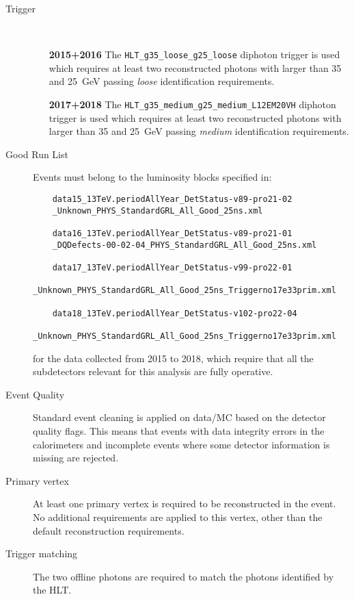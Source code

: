 \begin{description}
	
	\item[Trigger]~
	
	\begin{itemize}
		\item [\textbf{2015+2016}] The \texttt{HLT\_g35\_loose\_g25\_loose} diphoton trigger is used which requires at least two reconstructed photons with \ET larger than 35 and \SI{25}{\GeV} passing \emph{loose} identification requirements.
		
		\item [\textbf{2017+2018}] The \texttt{HLT\_g35\_medium\_g25\_medium\_L12EM20VH} diphoton trigger is used which requires at least two reconstructed photons with \ET larger than 35 and \SI{25}{\GeV} passing \emph{medium} identification requirements.
		
	\end{itemize}
	
	\item[Good Run List] Events must belong to the luminosity blocks specified in:
	\begin{verbatim}
	data15_13TeV.periodAllYear_DetStatus-v89-pro21-02
	_Unknown_PHYS_StandardGRL_All_Good_25ns.xml
	
	data16_13TeV.periodAllYear_DetStatus-v89-pro21-01
	_DQDefects-00-02-04_PHYS_StandardGRL_All_Good_25ns.xml
	
	data17_13TeV.periodAllYear_DetStatus-v99-pro22-01
	_Unknown_PHYS_StandardGRL_All_Good_25ns_Triggerno17e33prim.xml
	
	data18_13TeV.periodAllYear_DetStatus-v102-pro22-04
	_Unknown_PHYS_StandardGRL_All_Good_25ns_Triggerno17e33prim.xml
	\end{verbatim}
	for the data collected from 2015 to 2018, which require that all the subdetectors relevant for this analysis are fully operative.
	
	\item[Event Quality] Standard event cleaning is applied on data/MC based on the detector quality flags. This means that events with data integrity errors in the calorimeters and incomplete events where some detector information is missing are rejected.
	
	\item[Primary vertex] At least one primary vertex is required to be reconstructed in the event. No additional requirements are applied to this vertex, other than the default reconstruction requirements. 
	
	\item[Trigger matching]	The two offline photons are required to match the photons identified by the HLT.
	

\end{description}
